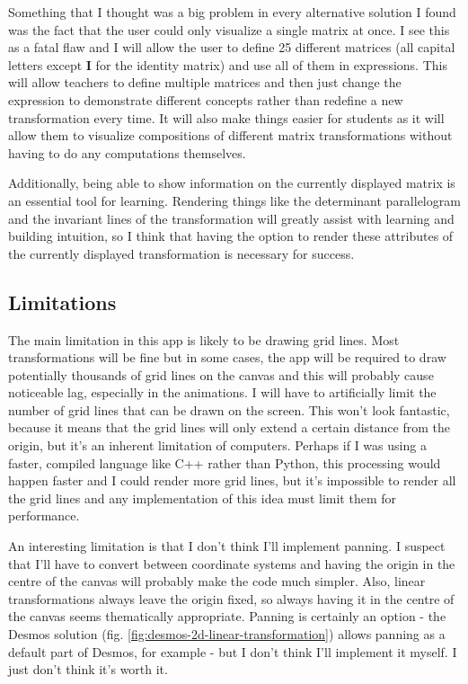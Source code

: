 \documentclass[../main.tex]{subfiles}
\begin{document}
Something that I thought was a big problem in every alternative solution I found was the fact that the user could only visualize a single matrix at once. I see this as a fatal flaw and I will allow the user to define 25 different matrices (all capital letters except $\mathbf{I}$ for the identity matrix) and use all of them in expressions. This will allow teachers to define multiple matrices and then just change the expression to demonstrate different concepts rather than redefine a new transformation every time. It will also make things easier for students as it will allow them to visualize compositions of different matrix transformations without having to do any computations themselves.

Additionally, being able to show information on the currently displayed matrix is an essential tool for learning. Rendering things like the determinant parallelogram and the invariant lines of the transformation will greatly assist with learning and building intuition, so I think that having the option to render these attributes of the currently displayed transformation is necessary for success.

\subsection{Limitations}

The main limitation in this app is likely to be drawing grid lines. Most transformations will be fine but in some cases, the app will be required to draw potentially thousands of grid lines on the canvas and this will probably cause noticeable lag, especially in the animations. I will have to artificially limit the number of grid lines that can be drawn on the screen. This won't look fantastic, because it means that the grid lines will only extend a certain distance from the origin, but it's an inherent limitation of computers. Perhaps if I was using a faster, compiled language like C++ rather than Python, this processing would happen faster and I could render more grid lines, but it's impossible to render all the grid lines and any implementation of this idea must limit them for performance.

An interesting limitation is that I don't think I'll implement panning. I suspect that I'll have to convert between coordinate systems and having the origin in the centre of the canvas will probably make the code much simpler. Also, linear transformations always leave the origin fixed, so always having it in the centre of the canvas seems thematically appropriate. Panning is certainly an option - the Desmos solution (fig. \ref{fig:desmos-2d-linear-transformation}) allows panning as a default part of Desmos, for example - but I don't think I'll implement it myself. I just don't think it's worth it.
\end{document}
